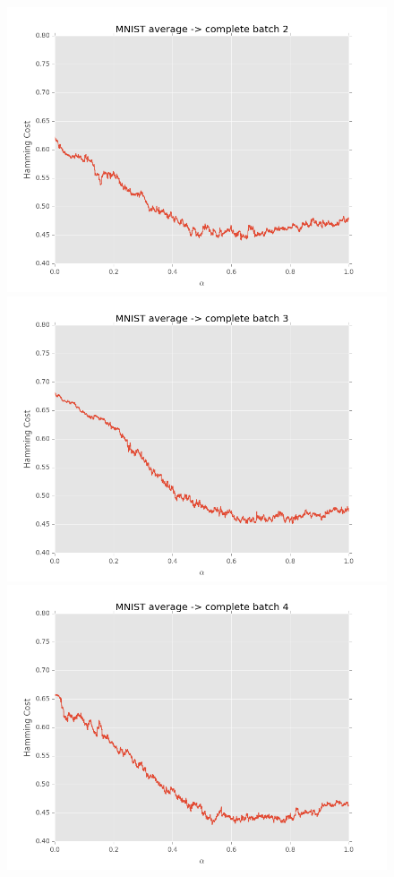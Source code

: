 \begin{figure}[h]
\begin{minipage}{.3\textwidth}
  \includegraphics[width=\linewidth]{images/mnist-ac-2}
\end{minipage}
\begin{minipage}{.3\textwidth}
  \centering
  \includegraphics[width=\linewidth]{images/mnist-ac-3}
\end{minipage}
\begin{minipage}{.3\textwidth}
  \centering
  \includegraphics[width=\linewidth]{images/mnist-ac-4}

\end{minipage}
\end{figure}
